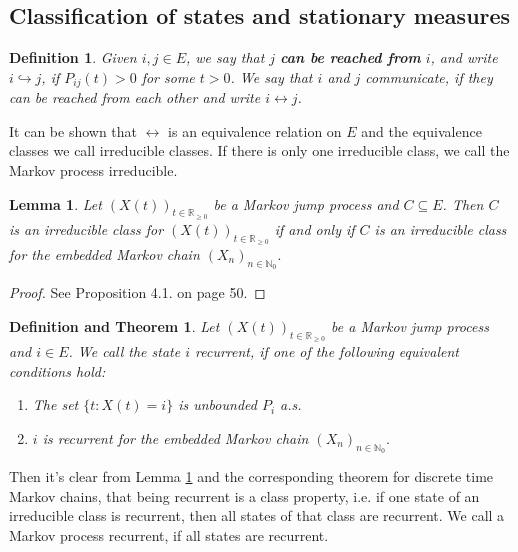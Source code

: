 \documentclass[12pt,a4paper]{scrartcl}
\newtheorem{definition}[theorem]{Definition}
\newtheorem{lemma}[theorem]{Lemma}
\newtheorem{definitionandtheorem}[theorem]{Definition and Theorem}
\numberwithin{equation}{section}
\newcommand{\R}{\mathbb{R}} %
\newcommand{\N}{\mathbb{N}} %
\begin{document}
\subsection{Classification of states and stationary measures}

\begin{definition}
Given $i,j \in E$, we say that $j$ \textbf{can be reached from} $i$, and write $i\hookrightarrow j $, if $P_{ij}\left(t\right) > 0 $ for some $ t > 0 $. We say that $i$ and $j$ communicate, if they can be reached from each other and write $i\leftrightarrow j$.
\end{definition}


It can be shown that $\leftrightarrow$ is an equivalence relation on $E$ and the equivalence classes we call irreducible classes. If there is only one irreducible class, we call the Markov process irreducible.

\begin{lemma}
\label{smalllemma}
Let $\left(X\left(t\right)\right)_{t \in \R_{\geq 0}} $ be a Markov jump process and $ C \subseteq E $. Then $C$ is an irreducible class for $ \left(X\left(t\right)\right)_{t \in \R_{\geq 0}} $ if and only if $C$ is an irreducible class for the embedded Markov chain $ \left(X_n\right)_{n \in \N_0}.$
\end{lemma}
\begin{proof}
See \cite{asmussen} Proposition 4.1. on page 50.
\end{proof}

\begin{definitionandtheorem}
Let $\left(X\left(t\right)\right)_{t \in \R_{\geq 0}} $ be a Markov jump process and $ i \in E $. We call the state $i$ recurrent, if one of the following equivalent conditions hold:
\begin{enumerate}
\item The set $\lbrace t: X\left(t\right) = i \rbrace  $ is unbounded $P_i$ a.s.
\item $i$ is recurrent for the embedded Markov chain $\left(X_n\right)_{n \in \N_0}. $
\end{enumerate}
\end{definitionandtheorem}

Then it's clear from Lemma \ref{smalllemma} and the corresponding theorem for discrete time Markov chains, that being recurrent is a class property, i.e. if one state of an irreducible class is recurrent, then all states of that class are recurrent.
We call a Markov process recurrent, if all states are recurrent.
\end{document}
